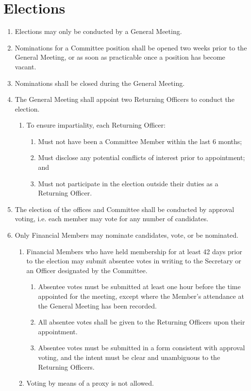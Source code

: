 \documentclass[a4paper]{article}
\begin{document}
\section{Elections} \label{sec:elections}
\begin{enumerate}
    \item Elections may only be conducted by a General Meeting.
    \item Nominations for a Committee position shall be opened two weeks prior to the General Meeting, or as soon as practicable once a position has become vacant.
    \item Nominations shall be closed during the General Meeting.
    \item The General Meeting shall appoint two Returning Officers to conduct the election.
        \begin{enumerate}
            \item To ensure impartiality, each Returning Officer:
             \begin{enumerate}
                  \item Must not have been a Committee Member within the last 6 months;
                  \item Must disclose any potential conflicts of interest prior to appointment; and
                  \item Must not participate in the election outside their duties as a Returning Officer.
            \end{enumerate}
        \end{enumerate}
    \item The election of the offices and Committee shall be conducted by approval voting, i.e. each member may vote for any number of candidates.
    \item Only Financial Members may nominate candidates, vote, or be nominated.
    \begin{enumerate}
        \item Financial Members who have held membership for at least 42 days prior to the election may submit absentee votes in writing to the Secretary or an Officer designated by the Committee.
        \begin{enumerate}
            \item Absentee votes must be submitted at least one hour before the time appointed for the meeting, except where the Member's attendance at the General Meeting has been recorded.
            \item All absentee votes shall be given to the Returning Officers upon their appointment.
            \item Absentee votes must be submitted in a form consistent with approval voting, and the intent must be clear and unambiguous to the Returning Officers.
        \end{enumerate}
        \item Voting by means of a proxy is not allowed.
    \end{enumerate}
\end{enumerate}
\end{document}
